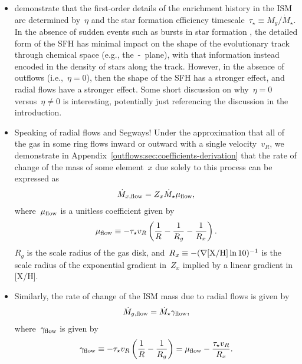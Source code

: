 \begin{itemize}
	\item \citet{Weinberg2017b} demonstrate that the first-order details of the
	enrichment history in the ISM are determined by~$\eta$ and the star
	formation efficiency timescale~$\tau_\star \equiv M_g / \dot{M}_\star$.
	In the absence of sudden events such as bursts in star formation
	\citep[e.g.,][]{Johnson2020}, the detailed form of the SFH has minimal
	impact on the shape of the evolutionary track through chemical space
	(e.g., the~\afe-\feh~plane), with that information instead encoded in the
	density of stars along the track.
	However, in the absence of outflows (i.e.,~$\eta = 0$), then the shape of
	the SFH has a stronger effect, and radial flows have a stronger effect.
	{\color{red} Some short discussion on why~$\eta = 0$ versus~$\eta \neq 0$
	is interesting, potentially just referencing the discussion in the
	introduction}.

	\item {\color{red} Speaking of radial flows and Segways!}
	Under the approximation that all of the gas in some ring flows
	inward or outward with a single velocity~$v_R$, we demonstrate in
	Appendix~\ref{outflows:sec:coefficients-derivation} that the rate of change
	of the mass of some element~$x$ due solely to this process can be expressed
	as
	\begin{equation}
	\dot{M}_{x,\text{flow}} = Z_x \dot{M}_\star \mu_{\text{flow}},
	\end{equation}
	where~$\mu_{\text{flow}}$ is a unitless coefficient given by
	\begin{equation}
	\mu_{\text{flow}} \equiv -\tau_\star v_R
	\left(\frac{1}{R} - \frac{1}{R_g} - \frac{1}{R_x}\right).
	\end{equation}
	$R_g$ is the scale radius of the gas disk, and~$R_x \equiv
	-(\nabla\text{[X/H]} \ln 10)^{-1}$ is the scale radius of the exponential gradient
	in~$Z_x$ implied by a linear gradient in [X/H].

	\item Similarly, the rate of change of the ISM mass due to radial flows is
	given by
	\begin{equation}
	\dot{M}_{g,\text{flow}} = \dot{M}_\star \gamma_{\text{flow}},
	\end{equation}
	where~$\gamma_{\text{flow}}$ is given by
	\begin{equation}
	\gamma_{\text{flow}} \equiv -\tau_\star v_R
	\left(\frac{1}{R} - \frac{1}{R_g}\right)
	= \mu_{\text{flow}} - \frac{\tau_\star v_R}{R_x}.
	\end{equation}


\end{itemize}
